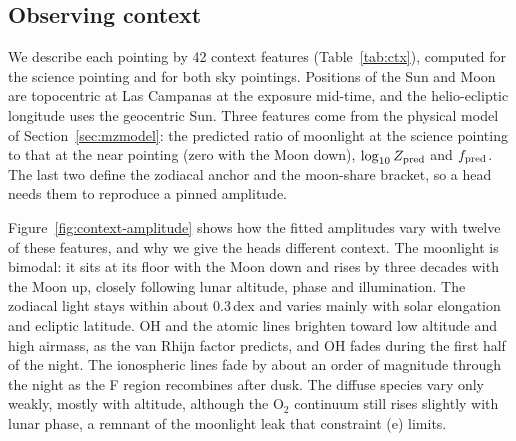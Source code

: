 \subsection{Observing context}
\label{sec:ctx}

We describe each pointing by 42 context features (Table~\ref{tab:ctx}),
computed for the science pointing and for both sky pointings. Positions of
the Sun and Moon are topocentric at Las Campanas at the exposure mid-time,
and the helio-ecliptic longitude uses the geocentric Sun. Three features come
from the physical model of Section~\ref{sec:mzmodel}: the predicted ratio of
moonlight at the science pointing to that at the near pointing (zero with
the Moon down), $\log_{10}Z_{\rm pred}$ and $f_{\rm pred}$. The last two
define the zodiacal anchor and the moon-share bracket, so a head needs them
to reproduce a pinned amplitude.

Figure~\ref{fig:context-amplitude} shows how the fitted amplitudes vary with
twelve of these features, and why we give the heads different context. The
moonlight is bimodal: it sits at its floor with the Moon down and rises by
three decades with the Moon up, closely following lunar altitude, phase and
illumination. The zodiacal light stays within about 0.3\,dex and varies
mainly with solar elongation and ecliptic latitude. OH and the atomic lines
brighten toward low altitude and high airmass, as the van Rhijn factor
predicts, and OH fades during the first half of the night. The ionospheric
lines fade by about an order of magnitude through the night as the F region
recombines after dusk. The diffuse species vary only weakly, mostly with
altitude, although the O$_2$ continuum still rises slightly with lunar
phase, a remnant of the moonlight leak that constraint (e) limits.

